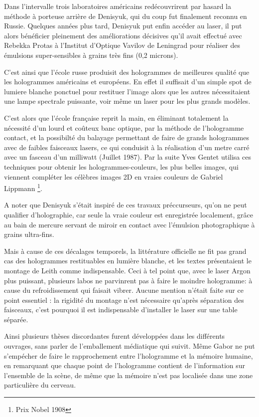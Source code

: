 \documentclass[a4paper,12pt]{article}
\begin{document}
Dans l'intervalle trois laboratoires américains redécouvrirent par hasard la méthode à porteuse arrière de Denisyuk, qui du coup fut finalement reconnu en Russie. Quelques années plus tard, Denisyuk put enfin accéder au laser, il put alors bénéficier pleinement des améliorations décisives qu'il avait effectué avec Rebekka Protas à l'Institut d'Optique Vavilov de Leningrad pour réaliser des émulsions super-sensibles à grains très fins (0,2 microns). 


C'est ainsi que l'école russe produisit des hologrammes de meilleures qualité que les hologrammes américains et européens. En effet il suffisait d'un simple spot de lumiere blanche ponctuel pour restituer l'image alors que les autres nécessitaient une lampe spectrale puissante, voir m\^eme un laser pour les plus grands modèles.



C'est alors que l'école française reprit la main, en éliminant totalement la nécessité d'un lourd et co\^uteux banc optique, par la méthode de l'hologramme contact, et la possibilté du balayage permettant de faire de grands hologrammes avec de faibles faisceaux lasers, ce qui conduisit à la réalisation d'un metre carré avec un fasceau d'un milliwatt (Juillet 1987). Par la suite Yves Gentet utilisa ces techniques pour obtenir les hologrammes-couleurs, les plus belles images, qui viennent compléter les célèbres images 2D en vraies couleurs de Gabriel Lippmann \footnote{Prix Nobel 1908}. 



A noter que Denisyuk s'était inspiré de ces travaux préccurseurs, qu'on ne peut qualifier d'holographie, car seule la vraie couleur est enregistrée localement, gr\^ace au bain de mercure servant de miroir en contact avec l'émulsion photographique à grains ultra-fins.


Mais à cause de ces décalages temporels, la littérature officielle ne fit pas grand cas des hologrammes restituables en lumière blanche, et les textes présentaient le montage de Leith comme indispensable. Ceci à tel point que, avec le laser Argon plus puissant, plusieurs labos ne parvinrent pas à faire le moindre hologramme: à cause du refroidissement qui faisait vibrer. Aucune mention n'était faite sur ce point essentiel : la rigidité du montage n'est nécessaire qu'après séparation des faisceaux, c'est pourquoi il est indispensable d'installer le laser sur une table séparée.


Ainsi plusieurs thèses discordantes furent développées dans les différents ouvrages, sans parler de l'emballement médiatique qui suivit. Même Gabor ne put s'empécher de faire le rapprochement entre l'hologramme et la mémoire humaine, en remarquant que chaque point de l'hologramme contient de l'information sur l'ensemble de la scène, de même que la mémoire n'est pas localisée dans une zone particulière du cerveau.
\end{document}
